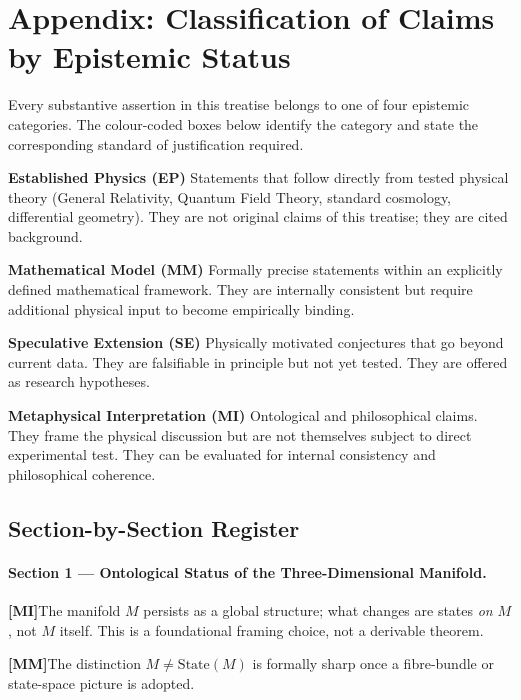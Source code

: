 \documentclass[12pt,a4paper]{article}
\newcommand{\claimbox}[3]{%
  \par\smallskip
  \begin{tcolorbox}[
    enhanced,
    breakable,
    width=\linewidth,
    colback=#1,
    colframe=#1,
    boxrule=0pt,
    arc=0pt,
    left=4pt, right=4pt,
    top=4pt, bottom=4pt,
    boxsep=0pt]
    \footnotesize\textbf{[#2]}\enspace #3
  \end{tcolorbox}%
  \smallskip}
\theoremstyle{definition}
\begin{document}
\section*{Appendix: Classification of Claims by Epistemic Status}

Every substantive assertion in this treatise belongs to one of four epistemic categories.
The colour-coded boxes below identify the category and state the corresponding standard of justification required.

\bigskip
\noindent
\colorbox{clEstab}{\textbf{Established Physics (EP)}}\enspace
Statements that follow directly from tested physical theory (General Relativity, Quantum Field Theory, standard cosmology, differential geometry).
They are not original claims of this treatise; they are cited background.

\medskip
\noindent
\colorbox{clModel}{\textbf{Mathematical Model (MM)}}\enspace
Formally precise statements within an explicitly defined mathematical framework.
They are internally consistent but require additional physical input to become empirically binding.

\medskip
\noindent
\colorbox{clSpec}{\textbf{Speculative Extension (SE)}}\enspace
Physically motivated conjectures that go beyond current data.
They are falsifiable in principle but not yet tested. They are offered as research hypotheses.

\medskip
\noindent
\colorbox{clMeta}{\textbf{Metaphysical Interpretation (MI)}}\enspace
Ontological and philosophical claims. They frame the physical discussion but are not themselves
subject to direct experimental test. They can be evaluated for internal consistency and philosophical coherence.

\bigskip

\subsection*{Section-by-Section Register}

\paragraph{Section 1 — Ontological Status of the Three-Dimensional Manifold.}
\claimbox{clMeta}{MI}{The manifold $M$ persists as a global structure; what changes are states \emph{on} $M$, not $M$ itself.  This is a foundational framing choice, not a derivable theorem.}
\claimbox{clModel}{MM}{The distinction $M \not= \mathrm{State}(M)$ is formally sharp once a fibre-bundle or state-space picture is adopted.}
\end{document}
